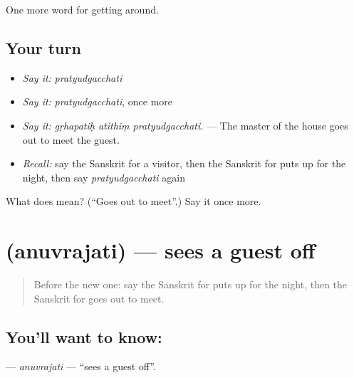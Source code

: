 \begin{grammarlens}[title={What you've built}]
One more word for getting around.
\end{grammarlens}

\subsection*{Your turn}
\begin{itemize}
\raggedright
  \item \emph{Say it:} \emph{pratyudgacchati}
  \item \emph{Say it:} \emph{pratyudgacchati}, once more
  \item \emph{Say it:} \emph{gṛhapatiḥ atithiṃ pratyudgacchati.} — The master of the house goes out to meet the guest.
  \item \emph{Recall:} say the Sanskrit for a visitor, then the Sanskrit for puts up for the night, then say \emph{pratyudgacchati} again
\end{itemize}

\begin{tcolorbox}[breakable,colback=teal!4,colframe=teal!35!black,title={Before you move on}]
What does  mean? (\textquotedblleft{}Goes out to meet\textquotedblright{}.) Say it once more.
\end{tcolorbox}
\section[\texorpdfstring{\sk{अनुव्रजति} (anuvrajati)}{अनुव्रजति (anuvrajati)}]{ (anuvrajati) — sees a guest off}

\label{lesson:SA-C428-anuvrajati}



\begin{quote}
Before the new one: say the Sanskrit for puts up for the night, then the Sanskrit for goes out to meet.
\end{quote}

\subsection*{You'll want to know: }
\textbf{} — \emph{anuvrajati} — \textquotedblleft{}sees a guest off\textquotedblright{}.

\begin{quote}
  
\end{quote}

